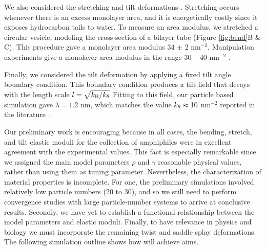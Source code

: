 We also considered the stretching and tilt deformations \cite{Fu2018_SIAM}. 
Stretching occurs whenever there is an excess monolayer area,
and it is energetically costly since it exposes hydrocarbon tails to water.
To measure an area modulus, we stretched a circular vesicle, modeling the cross-section 
of a bilayer tube (Figure \ref{fig:bend}B \& C).
This procedure gave a monolayer area modulus 
34 $\pm$ 2 \kBT \;nm$^{-2}$. Manipulation experiments give a monolayer area modulus in the range 
30 -- 40 \kBT\; nm$^{-2}$ \cite{Nagle17, Nagle17-2}. 

Finally, we considered the tilt deformation by applying a fixed tilt angle boundary condition. 
This boundary condition produces a tilt field that decays with the length scale $l = \sqrt{k_{\mathrm{B}}/k_{\theta}}$ 
Fitting to this field, our particle based simulation gave $\lambda = 1.2$ nm, which matches
the value $k_{\theta} \approx 10$ \kBT \; nm$^{-2}$ reported in the literature \cite{KUZMIN2005, KoNa15}.

Our preliminary work is encouraging because in all cases, the bending, stretch, and tilt elastic moduli for the collection of amphiphiles
were in excellent agreement with the experimental values. This fact is especially remarkable 
since we assigned the main model parameters $\rho$ and $\gamma$ reasonable physical values, rather than using them as tuning parameter. 
Nevertheless, the characterization of material properties is incomplete. For one, the preliminary simulations involved relatively low particle numbers (20 to 30), and so we still need to
perform convergence studies with large particle-number systems to arrive at conclusive results. Secondly, we have yet to establish a functional
relationship between the model parameters and elastic moduli. Finally, to have relevance in physics and biology
we must incorporate the remaining twist and saddle splay deformations.
The following simulation outline shows how will achieve aims. 



